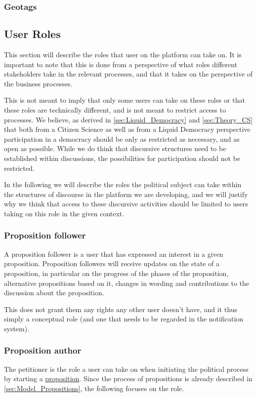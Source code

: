 \subsubsection{Geotags}

\subsection{User Roles}
\label{sec:UserRoles}
This section will describe the roles that user on the platform can take on.
It is important to note that this is done from a perspective of what roles different stakeholders take in the relevant processes, and that it takes on the perspective of the business processes.

This is not meant to imply that only some users can take on these roles or that these roles are technically different, and is not meant to restrict access to processes. We believe, as derived in \ref{sec:Liquid_Democracy} and \ref{sec:Theory_CS} that both from a Citizen Science as well as from a Liquid Democracy perspective participation in a democracy should be only as restricted as necessary, and as open as possible. While we do think that discursive structures need to be established within discussions, the possibilities for participation should not be restricted.

In the following we will describe the roles the political subject can take within the structures of discourse in the platform we are developing, and we will justify why we think that access to these discursive activities should be limited to users taking on this role in the given context.

\subsubsection{Proposition follower}
A proposition follower is a user that has expressed an interest in a given proposition. Proposition followers will receive updates on the state of a proposition, in particular on the progress of the phases of the proposition, alternative propositions based on it, changes in wording and contributions to the discussion about the proposition.

This does not grant them any rights any other user doesn't have, and it thus simply a conceptual role (and one that needs to be regarded in the notification system).

\subsubsection{Proposition author}
\label{ssec:Roles_Petitioner}
The petitioner is the role a user can take on when initiating the political process by starting a \hyperref[sec:Model_Propositions]{proposition}. Since the process of propositions is already described in \ref{sec:Model_Propositions}, the following focuses on the role.

